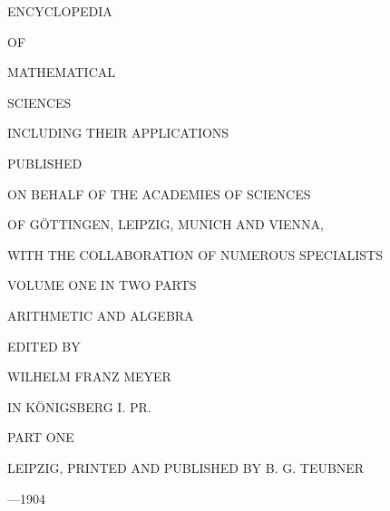\begin{center}
{\fontsize{24}{30}\selectfont ENCYCLOPEDIA}

\vspace{0.5cm}
{\fontsize{24}{30}\selectfont OF}

\vspace{0.5cm}
{\fontsize{24}{30}\selectfont MATHEMATICAL}

\vspace{0.5cm}
{\fontsize{24}{30}\selectfont SCIENCES}

\vspace{0.8cm}
{\fontsize{18}{24}\selectfont INCLUDING THEIR APPLICATIONS}

\vspace{1cm}
{\fontsize{16}{20}\selectfont PUBLISHED}

\vspace{0.5cm}
{\fontsize{16}{20}\selectfont ON BEHALF OF THE ACADEMIES OF SCIENCES}

\vspace{0.3cm}
{\fontsize{16}{20}\selectfont OF GÖTTINGEN, LEIPZIG, MUNICH AND VIENNA,}

\vspace{0.3cm}
{\fontsize{16}{20}\selectfont WITH THE COLLABORATION OF NUMEROUS SPECIALISTS}

\vspace{1cm}
{\fontsize{18}{24}\selectfont VOLUME ONE IN TWO PARTS}

\vspace{0.8cm}
{\fontsize{20}{26}\selectfont ARITHMETIC AND ALGEBRA}

\vspace{0.8cm}
{\fontsize{16}{20}\selectfont EDITED BY}

\vspace{0.5cm}
{\fontsize{18}{24}\selectfont WILHELM FRANZ MEYER}

\vspace{0.3cm}
{\fontsize{16}{20}\selectfont IN KÖNIGSBERG I. PR.}

\vspace{0.8cm}
{\fontsize{18}{24}\selectfont PART ONE}

\vspace{2cm}
{\fontsize{16}{20}\selectfont LEIPZIG, PRINTED AND PUBLISHED BY B. G. TEUBNER}

\vspace{0.5cm}
{\fontsize{16}{20}—1904}
\end{center}
